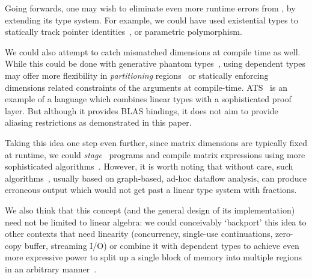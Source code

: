 Going forwards, one may wish to eliminate even more runtime errors from \lang,
by extending its type system. For example, we could have used existential types
to statically track pointer identities~\cite{ahmed20073}, or parametric
polymorphism.

We could also attempt to catch mismatched dimensions at compile time as well.
While this could be done with generative phantom types~\cite{abe2015simple},
using dependent types may offer more flexibility in \emph{partitioning}
regions~\cite{space_monads} or statically enforcing dimensions related
constraints of the arguments at compile-time.  ATS~\cite{cui2005ats} is an
example of a language which combines linear types with a sophisticated proof
layer. But although it provides BLAS bindings, it does not aim to provide
aliasing restrictions as demonstrated in this paper.

Taking this idea one step even further, since matrix dimensions are typically
fixed at runtime, we could \emph{stage} \lang\ programs and compile matrix
expressions using more sophisticated algorithms~\cite{barthels}. However, it is
worth noting that without care, such algorithms~\cite{rocklin_thesis}, usually
based on graph-based, ad-hoc dataflow analysis, can produce erroneous output
which would not get past a linear type system with fractions.

We also think that this concept (and the general design of its implementation)
need not be limited to linear algebra: we could conceivably `backport' this
idea to other contexts that need linearity (concurrency, single-use
continuations, zero-copy buffer, streaming I/O) or combine it with dependent
types to achieve even more expressive power to split up a single block of
memory into multiple regions in an arbitrary manner~\cite{space_monads}.
